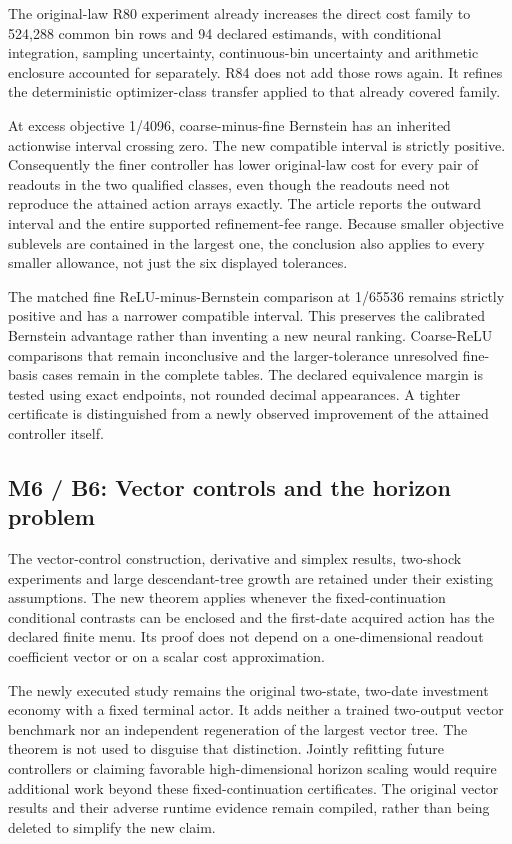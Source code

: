 \documentclass[ecta,nameyear,draft]{econsocart}
\begin{document}
The original-law R80 experiment already increases the direct cost family
to 524,288 common bin rows and 94 declared estimands, with conditional
integration, sampling uncertainty, continuous-bin uncertainty and
arithmetic enclosure accounted for separately. R84 does not add those
rows again. It refines the deterministic optimizer-class transfer
applied to that already covered family.

At excess objective 1/4096, coarse-minus-fine Bernstein has an inherited
actionwise interval crossing zero. The new compatible interval is
strictly positive. Consequently the finer controller has lower
original-law cost for every pair of readouts in the two qualified
classes, even though the readouts need not reproduce the attained action
arrays exactly. The article reports the outward interval and the entire
supported refinement-fee range. Because smaller objective sublevels are
contained in the largest one, the conclusion also applies to every
smaller allowance, not just the six displayed tolerances.

The matched fine ReLU-minus-Bernstein comparison at 1/65536 remains
strictly positive and has a narrower compatible interval. This preserves
the calibrated Bernstein advantage rather than inventing a new neural
ranking. Coarse-ReLU comparisons that remain inconclusive and the
larger-tolerance unresolved fine-basis cases remain in the complete
tables. The declared equivalence margin is tested using exact endpoints,
not rounded decimal appearances. A tighter certificate is distinguished
from a newly observed improvement of the attained controller itself.

\hypertarget{m6-b6-vector-controls-and-the-horizon-problem}{%
\subsection{M6 / B6: Vector controls and the horizon
problem}\label{m6-b6-vector-controls-and-the-horizon-problem}}

The vector-control construction, derivative and simplex results,
two-shock experiments and large descendant-tree growth are retained
under their existing assumptions. The new theorem applies whenever the
fixed-continuation conditional contrasts can be enclosed and the
first-date acquired action has the declared finite menu. Its proof does
not depend on a one-dimensional readout coefficient vector or on a
scalar cost approximation.

The newly executed study remains the original two-state, two-date
investment economy with a fixed terminal actor. It adds neither a
trained two-output vector benchmark nor an independent regeneration of
the largest vector tree. The theorem is not used to disguise that
distinction. Jointly refitting future controllers or claiming favorable
high-dimensional horizon scaling would require additional work beyond
these fixed-continuation certificates. The original vector results and
their adverse runtime evidence remain compiled, rather than being
deleted to simplify the new claim.
\end{document}
